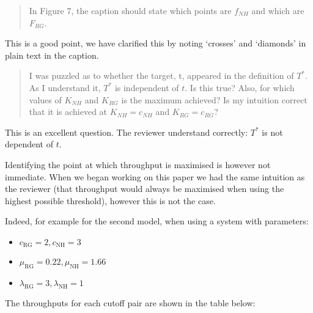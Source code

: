 \documentclass{article}
\begin{document}
\begin{quote}
    \begin{textit}
        {
            In Figure 7, the caption should state which points are \(f_{NH}\) and
            which are \(F_{RG}\).
        }
    \end{textit}
\end{quote}

This is a good point, we have clarified this by noting `crosses' and `diamonds' in plain text in the caption.

\begin{quote}
    \begin{textit}
        {
I was puzzled as to whether the target, t, appeared in the definition
of \(T^*\). As I understand it, \(T^*\) is independent of \(t\). Is this true?
Also, for which values of \(K_{NH}\) and \(K_{RG}\) is the maximum achieved? Is my
intuition correct that it is achieved at \(K_{NH} = c_{NH}\) and \(K_{RG} = c_{RG}\)?
        }
    \end{textit}
\end{quote}

This is an excellent question. The reviewer understand correctly: \(T^*\) is
not dependent of \(t\).

Identifying the point at which throughput is maximised is however not
immediate. When we began working on this paper we had the same intuition as the
reviewer (that throughput would always be maximised when using the highest
possible threshold), however this is not the case.

Indeed, for example for the second model, when using a system with parameters:

\begin{itemize}
    \item \(c_{\text{RG}}=2, c_{\text{NH}}=3\)
    \item \(\mu_{\text{RG}}=0.22, \mu_{\text{NH}}=1.66\)
    \item \(\lambda_{\text{RG}}=3, \lambda_{\text{NH}}=1\)
\end{itemize}

The throughputs for each cutoff pair are shown in the table below:
\end{document}
